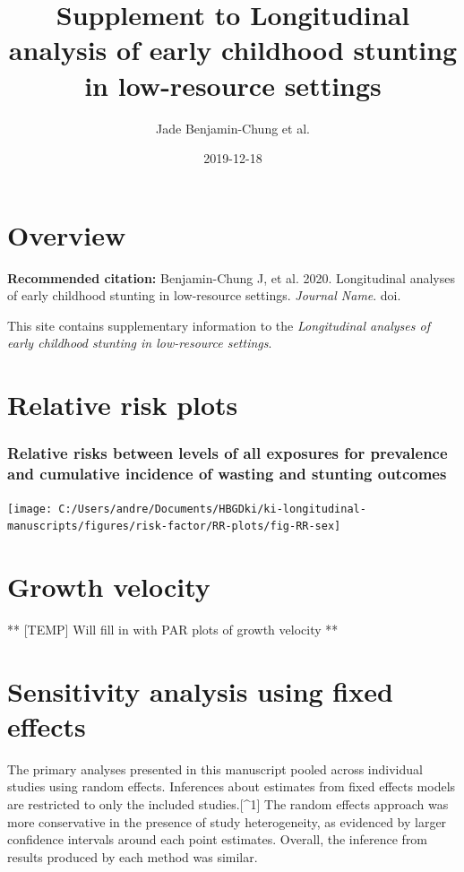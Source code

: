 \documentclass[9pt,]{book}
\title{Supplement to Longitudinal analysis of early childhood stunting in
low-resource settings}
\author{Jade Benjamin-Chung et al.}
\date{2019-12-18}
\begin{document}
\maketitle

{
\setcounter{tocdepth}{1}
\tableofcontents
}
\chapter{Overview}\label{overview}

\textbf{Recommended citation:} Benjamin-Chung J, et al. 2020.
Longitudinal analyses of early childhood stunting in low-resource
settings. \emph{Journal Name}. doi.

This site contains supplementary information to the \emph{Longitudinal
analyses of early childhood stunting in low-resource settings}.

\chapter{Relative risk plots}\label{RR}

\raggedright

\subsection{Relative risks between levels of all exposures for
prevalence and cumulative incidence of wasting and stunting
outcomes}\label{relative-risks-between-levels-of-all-exposures-for-prevalence-and-cumulative-incidence-of-wasting-and-stunting-outcomes}

\texttt{[image: C:/Users/andre/Documents/HBGDki/ki-longitudinal-manuscripts/figures/risk-factor/RR-plots/fig-RR-sex]}

\chapter{Growth velocity}\label{velocity}

\raggedright

** {[}TEMP{]} Will fill in with PAR plots of growth velocity **

\chapter{Sensitivity analysis using fixed effects}\label{fixed-effects}

\raggedright

The primary analyses presented in this manuscript pooled across
individual studies using random effects. Inferences about estimates from
fixed effects models are restricted to only the included
studies.{[}\^{}1{]} The random effects approach was more conservative in
the presence of study heterogeneity, as evidenced by larger confidence
intervals around each point estimates. Overall, the inference from
results produced by each method was similar.
\end{document}

